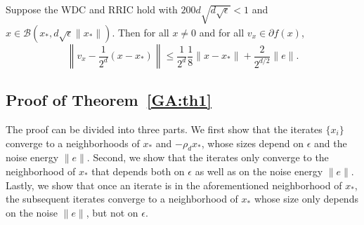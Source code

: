\begin{lemma} \label{GA:le10}
Suppose the WDC and RRIC
hold with $200 d \sqrt{d \sqrt{\epsilon}} < 1$ and $x \in \mathcal{B}(x_*, d \sqrt{\epsilon} \|x_*\|)$.  Then
for all $x \neq 0$ and for all $v_x \in \partial f(x)$,
\begin{equation*}
\left\|v_x - \frac{1}{2^d} (x - x_*)\right\| \leq \frac{1}{2^d} \frac{1}{8} \|x - x_*\| + \frac{2}{2^{d/2}} \|e\|.
\end{equation*}%
\end{lemma}


\subsection{Proof of Theorem~\ref{GA:th1}} \label{GA:s4}

The proof can be divided into three parts. We first show that the iterates $\{x_i\}$ converge to a neighborhoods of $x_*$ and $-\rho_d x_*$, whose sizes depend on $\epsilon$ and the noise energy $\|e\|$.
Second, we show that the iterates only converge to the neighborhood of $x_*$ that depends both on $\epsilon$ as well as on the noise energy $\|e\|$.
Lastly, we show that once an iterate is in the aforementioned neighborhood of $x_*$, the subsequent iterates converge to a neighborhood of $x_*$ whose size only depends on the noise $\|e\|$, but not on $\epsilon$.

